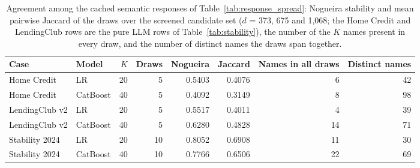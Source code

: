 \documentclass[final,5p,twocolumn]{elsarticle}
\newcommand{\Kfeat}{K}
\begin{document}
\begin{table}[htbp]
\centering
\footnotesize
\begin{threeparttable}
\caption{Agreement among the cached semantic responses of Table~\ref{tab:response_spread}: Nogueira stability and mean pairwise Jaccard of the draws over the screened candidate set ($d$ = 373, 675 and 1,068; the Home Credit and LendingClub rows are the pure LLM rows of Table~\ref{tab:stability}), the number of the $\Kfeat$ names present in every draw, and the number of distinct names the draws span together.}
\label{tab:response_lists}
\setlength{\tabcolsep}{5pt}
\begin{tabular}{@{}llrrrrrr@{}}
\toprule
Case & Model & $\Kfeat$ & Draws & Nogueira & Jaccard & Names in all draws & Distinct names \\
\midrule
Home Credit & LR & 20 & 5 & 0.5403 & 0.4076 & 6 & 42 \\
Home Credit & CatBoost & 40 & 5 & 0.4092 & 0.3149 & 8 & 98 \\
LendingClub v2 & LR & 20 & 5 & 0.5517 & 0.4011 & 4 & 39 \\
LendingClub v2 & CatBoost & 40 & 5 & 0.6280 & 0.4828 & 14 & 71 \\
\addlinespace
Stability 2024 & LR & 20 & 10 & 0.8052 & 0.6908 & 11 & 30 \\
Stability 2024 & CatBoost & 40 & 10 & 0.7766 & 0.6506 & 22 & 69 \\
\bottomrule
\end{tabular}
\end{threeparttable}
\end{table}
\end{document}

